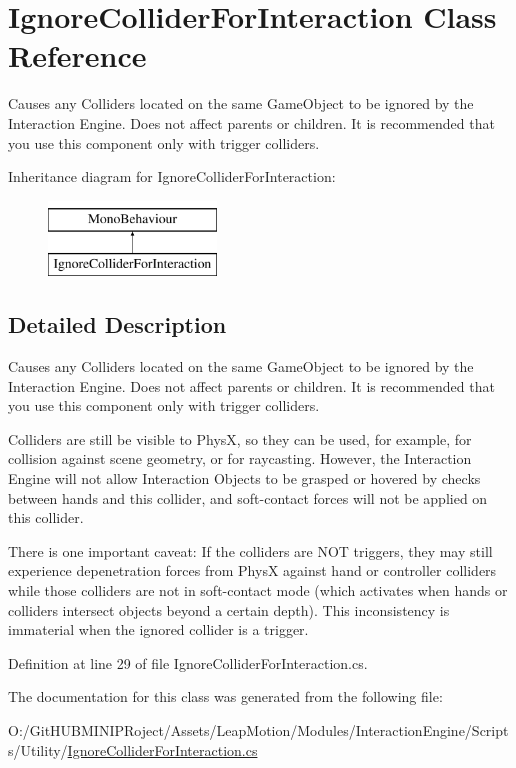 \hypertarget{class_ignore_collider_for_interaction}{}\section{Ignore\+Collider\+For\+Interaction Class Reference}
\label{class_ignore_collider_for_interaction}


Causes any Colliders located on the same Game\+Object to be ignored by the Interaction Engine. Does not affect parents or children. It is recommended that you use this component only with trigger colliders.  


Inheritance diagram for Ignore\+Collider\+For\+Interaction\+:\begin{figure}[H]
\begin{center}
\leavevmode
\includegraphics[height=2.000000cm]{class_ignore_collider_for_interaction}
\end{center}
\end{figure}


\subsection{Detailed Description}
Causes any Colliders located on the same Game\+Object to be ignored by the Interaction Engine. Does not affect parents or children. It is recommended that you use this component only with trigger colliders. 

Colliders are still be visible to PhysX, so they can be used, for example, for collision against scene geometry, or for raycasting. However, the Interaction Engine will not allow Interaction Objects to be grasped or hovered by checks between hands and this collider, and soft-\/contact forces will not be applied on this collider.

There is one important caveat\+: If the colliders are N\+OT triggers, they may still experience depenetration forces from PhysX against hand or controller colliders while those colliders are not in soft-\/contact mode (which activates when hands or colliders intersect objects beyond a certain depth). This inconsistency is immaterial when the ignored collider is a trigger. 

Definition at line 29 of file Ignore\+Collider\+For\+Interaction.\+cs.



The documentation for this class was generated from the following file\+:\begin{DoxyCompactItemize}
\item 
O\+:/\+Git\+H\+U\+B\+M\+I\+N\+I\+P\+Roject/\+Assets/\+Leap\+Motion/\+Modules/\+Interaction\+Engine/\+Scripts/\+Utility/\mbox{\hyperlink{_ignore_collider_for_interaction_8cs}{Ignore\+Collider\+For\+Interaction.\+cs}}\end{DoxyCompactItemize}
